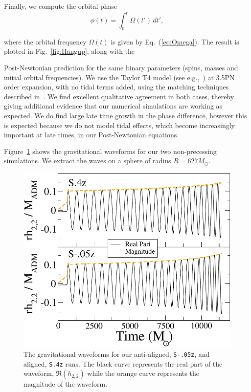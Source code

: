 Finally, we compute the orbital phase 
\begin{equation}
\phi(t) = \int_0^t \Omega(t')\, dt',
\end{equation}

where the orbital frequency $\Omega(t)$ is given by
Eq.~(\ref{eq:Omega}).
The result is plotted in Fig.~\ref{fig:Hangup}, along with the

Post-Newtonian prediction for the same binary parameters (spins,
masses and initial orbital frequencies). We use the Taylor T4 model (see e.g.,~\cite{Boyle2007}) at 3.5PN order expansion, with no tidal terms added, using
the matching techniques described in~\cite{OssokineEtAl:2014}. We find
excellent qualitative agreement in both cases, thereby giving
additional evidence that our numerical simulations are working as
expected. We do find large late time growth in the phase difference,
however this is expected because we do not model tidal effects, which
become increasingly important at late times, in our
Post-Newtonian equations.


Figure~\ref{fig:AlignedGW} shows the gravitational waveforms for our
two non-precessing simulations. We extract the waves on a sphere of
radius $R=627M_{\odot}$. 


\begin{figure}
\includegraphics[width=0.95\columnwidth]{chap2/AlignedGW}
\caption[The gravitational waveforms for our anti-aligned and aligned runs.] { {\label{fig:AlignedGW}} The gravitational waveforms for our
  anti-aligned, {\tt S-.05z}, and aligned, {\tt S.4z} runs. The black curve
  represents the real part of the waveform, $\Re(h_{2,2})$ while the
  orange curve represents the magnitude of the waveform.}
\end{figure}





